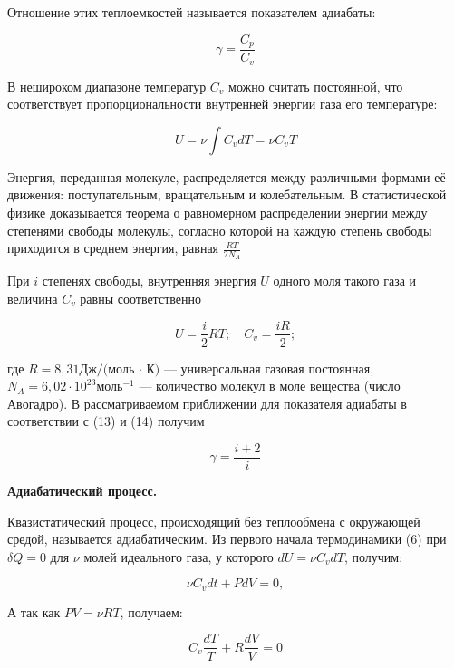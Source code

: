 \documentclass[10pt]{article}
\begin{document}
    Отношение этих теплоемкостей называется показателем адиабаты:

    \begin{equation}
        \gamma = \frac{C_p}{C_v}
    \end{equation}

    В нешироком диапазоне температур $C_v$ можно считать постоянной, что соответствует пропорциональности внутренней энергии газа его температуре:

    \begin{equation}
        U = \nu \int C_v dT = \nu C_v T
    \end{equation}

    Энергия, переданная молекуле, распределяется между различными формами её движения: поступательным, вращательным и колебательным. В статистической физике доказывается теорема о равномерном распределении энергии между степенями свободы молекулы, согласно которой на каждую степень свободы приходится в среднем энергия, равная $\frac{RT}{2 N_A}$

    При $i$ степенях свободы, внутренняя энергия $U$ одного моля такого газа и величина $C_v$ равны соответственно

    \begin{equation}
        U = \frac{i}{2}RT; \quad C_v = \frac{iR}{2}; 
    \end{equation}

    где $R = 8,31 \text{Дж}/\text{(моль · К)}$ — универсальная газовая постоянная, $N_A = 6,02 \cdot 10^{23} \text{моль}^{−1}$ — количество молекул в моле вещества (число Авогадро).
    В рассматриваемом приближении для показателя адиабаты в соответствии с (13) и (14) получим

    \begin{equation}
        \gamma = \frac{i+2}{i}
    \end{equation}

    \textbf{Адиабатический процесс.}

    Квазистатический процесс, происходящий без теплообмена с окружающей средой, называется адиабатическим.
    Из первого начала термодинамики (6) при $\delta Q = 0$ для $\nu$ молей идеального газа, у которого $dU = \nu C_v dT$, получим:

    \begin{equation}
        \nu C_v dt + P dV = 0,
    \end{equation}

    А так как $PV = \nu RT$, получаем: 

    \begin{equation}
        C_v \frac{dT}{T} + R \frac{dV}{V} = 0
    \end{equation}
\end{document}
